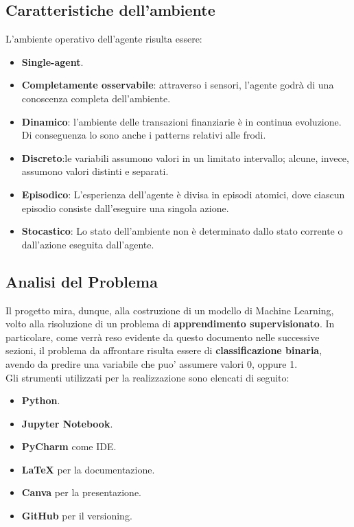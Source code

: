 \documentclass[]{article}
\begin{document}
    \subsection{Caratteristiche dell'ambiente}
        L'ambiente operativo dell'agente risulta essere:
        \begin{itemize}
            \item \textbf{Single-agent}.
            \item \textbf{Completamente osservabile}: attraverso i sensori, l'agente godrà di una conoscenza completa dell'ambiente.
            \item \textbf{Dinamico}: l'ambiente delle transazioni finanziarie è in continua evoluzione. Di conseguenza lo sono anche i patterns relativi alle frodi.
            \item \textbf{Discreto}:le variabili assumono valori in un limitato intervallo; alcune, invece, assumono valori distinti e separati.
            \item \textbf{Episodico}: L'esperienza dell'agente è divisa in episodi atomici, dove ciascun episodio consiste dall'eseguire una singola azione.
            \item \textbf{Stocastico}: Lo stato dell'ambiente non è determinato dallo stato corrente o dall'azione eseguita dall'agente.
        \end{itemize}

    \subsection{Analisi del Problema}
        Il progetto mira, dunque, alla costruzione di un modello di Machine Learning, volto alla risoluzione di un problema di \textbf{apprendimento supervisionato}. In particolare, come verrà reso evidente da questo documento nelle successive sezioni, il problema da affrontare risulta essere di \textbf{classificazione binaria}, avendo da predire una variabile che puo' assumere valori 0, oppure 1.\\
        Gli strumenti utilizzati per la realizzazione sono elencati di seguito:
        \begin{itemize}
            \item \textbf{Python}.
            \item \textbf{Jupyter Notebook}.
            \item \textbf{PyCharm} come IDE.
            \item \textbf{LaTeX} per la documentazione.
            \item \textbf{Canva} per la presentazione.
            \item \textbf{GitHub} per il versioning.
        \end{itemize}
\end{document}
